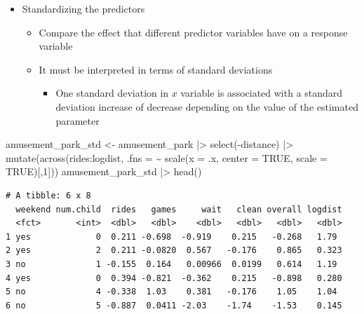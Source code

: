 \documentclass[
  ignorenonframetext,
]{beamer}
\newenvironment{Shaded}{\begin{snugshade}}{\end{snugshade}}
\newcommand{\AttributeTok}[1]{\textcolor[rgb]{0.40,0.45,0.13}{#1}}
\newcommand{\ConstantTok}[1]{\textcolor[rgb]{0.56,0.35,0.01}{#1}}
\newcommand{\DecValTok}[1]{\textcolor[rgb]{0.68,0.00,0.00}{#1}}
\newcommand{\FunctionTok}[1]{\textcolor[rgb]{0.28,0.35,0.67}{#1}}
\newcommand{\NormalTok}[1]{\textcolor[rgb]{0.00,0.23,0.31}{#1}}
\newcommand{\OtherTok}[1]{\textcolor[rgb]{0.00,0.23,0.31}{#1}}
\newcommand{\SpecialCharTok}[1]{\textcolor[rgb]{0.37,0.37,0.37}{#1}}
\providecommand{\tightlist}{%
  \setlength{\itemsep}{0pt}\setlength{\parskip}{0pt}}\usepackage{longtable,booktabs,array}
\begin{document}
\begin{frame}[fragile]{}
\label{section-34}
\begin{itemize}
\item
  Standardizing the predictors

  \begin{itemize}
  \tightlist
  \item
    Compare the effect that different predictor variables have on a
    response variable
  \item
    It must be interpreted in terms of standard deviations

    \begin{itemize}
    \tightlist
    \item
      One standard deviation in \(x\) variable is associated with a
      standard deviation increase of decrease depending on the value of
      the estimated parameter
    \end{itemize}
  \end{itemize}
\end{itemize}

\tiny

\begin{Shaded}
\begin{Highlighting}[]
\NormalTok{amusement\_park\_std }\OtherTok{\textless{}{-}}\NormalTok{ amusement\_park }\SpecialCharTok{|\textgreater{}} 
  \FunctionTok{select}\NormalTok{(}\SpecialCharTok{{-}}\NormalTok{distance) }\SpecialCharTok{|\textgreater{}} 
  \FunctionTok{mutate}\NormalTok{(}\FunctionTok{across}\NormalTok{(rides}\SpecialCharTok{:}\NormalTok{logdist, }
                \AttributeTok{.fns =} \SpecialCharTok{\textasciitilde{}} \FunctionTok{scale}\NormalTok{(}\AttributeTok{x =}\NormalTok{ .x, }
                               \AttributeTok{center =} \ConstantTok{TRUE}\NormalTok{, }
                               \AttributeTok{scale =} \ConstantTok{TRUE}\NormalTok{)[,}\DecValTok{1}\NormalTok{]))}
\NormalTok{amusement\_park\_std }\SpecialCharTok{|\textgreater{}} \FunctionTok{head}\NormalTok{()}
\end{Highlighting}
\end{Shaded}

\begin{verbatim}
# A tibble: 6 x 8
  weekend num.child  rides   games     wait   clean overall logdist
  <fct>       <int>  <dbl>   <dbl>    <dbl>   <dbl>   <dbl>   <dbl>
1 yes             0  0.211 -0.698  -0.919    0.215   -0.268   1.79 
2 yes             2  0.211 -0.0820  0.567   -0.176    0.865   0.323
3 no              1 -0.155  0.164   0.00966  0.0199   0.614   1.19 
4 yes             0  0.394 -0.821  -0.362    0.215   -0.898   0.280
5 no              4 -0.338  1.03    0.381   -0.176    1.05    1.04 
6 no              5 -0.887  0.0411 -2.03    -1.74    -1.53    0.145
\end{verbatim}
\end{frame}
\end{document}
